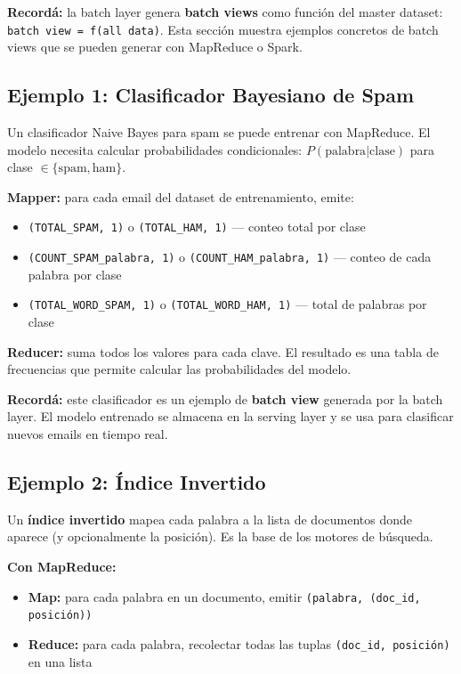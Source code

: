 \documentclass[11pt, a4paper]{article}
\begin{document}
\begin{recallbox}
	\textbf{Recordá:} la batch layer genera \textbf{batch views} como función del master dataset: \texttt{batch view = f(all data)}. Esta sección muestra ejemplos concretos de batch views que se pueden generar con MapReduce o Spark.
\end{recallbox}

\subsection{Ejemplo 1: Clasificador Bayesiano de Spam}

Un clasificador Naive Bayes para spam se puede entrenar con MapReduce. El modelo necesita calcular probabilidades condicionales: $P(\text{palabra} | \text{clase})$ para clase $\in \{\text{spam}, \text{ham}\}$.

\textbf{Mapper:} para cada email del dataset de entrenamiento, emite:
\begin{itemize}
	\item \texttt{(TOTAL\_SPAM, 1)} o \texttt{(TOTAL\_HAM, 1)} --- conteo total por clase
	\item \texttt{(COUNT\_SPAM\_palabra, 1)} o \texttt{(COUNT\_HAM\_palabra, 1)} --- conteo de cada palabra por clase
	\item \texttt{(TOTAL\_WORD\_SPAM, 1)} o \texttt{(TOTAL\_WORD\_HAM, 1)} --- total de palabras por clase
\end{itemize}

\textbf{Reducer:} suma todos los valores para cada clave. El resultado es una tabla de frecuencias que permite calcular las probabilidades del modelo.

\begin{recallbox}
	\textbf{Recordá:} este clasificador es un ejemplo de \textbf{batch view} generada por la batch layer. El modelo entrenado se almacena en la serving layer y se usa para clasificar nuevos emails en tiempo real.
\end{recallbox}

\subsection{Ejemplo 2: Índice Invertido}

Un \textbf{índice invertido} mapea cada palabra a la lista de documentos donde aparece (y opcionalmente la posición). Es la base de los motores de búsqueda.

\textbf{Con MapReduce:}
\begin{itemize}
	\item \textbf{Map:} para cada palabra en un documento, emitir \texttt{(palabra, (doc\_id, posición))}
	\item \textbf{Reduce:} para cada palabra, recolectar todas las tuplas \texttt{(doc\_id, posición)} en una lista
\end{itemize}
\end{document}
